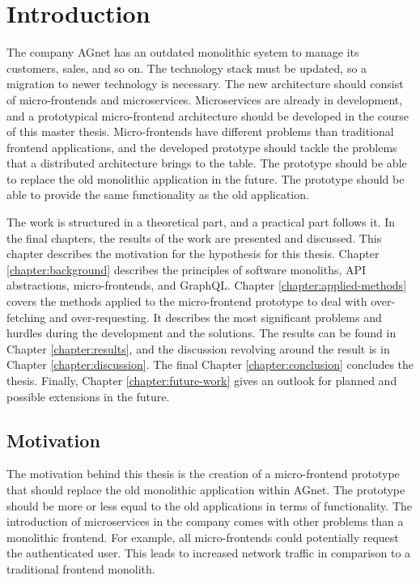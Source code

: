 \chapter{Introduction}\label{chapter:introduction}

The company AGnet has an outdated monolithic system to manage its customers, sales, and so on. The technology stack must be updated, so a migration to newer technology is necessary. The new architecture should consist of micro-frontends and microservices. Microservices are already in development, and a prototypical micro-frontend architecture should be developed in the course of this master thesis. Micro-frontends have different problems than traditional frontend applications, and the developed prototype should tackle the problems that a distributed architecture brings to the table. The prototype should be able to replace the old monolithic application in the future. The prototype should be able to provide the same functionality as the old application.

\bigskip

\noindent The work is structured in a theoretical part, and a practical part follows it. In the final chapters, the results of the work are presented and discussed. This chapter describes the motivation for the hypothesis for this thesis. Chapter \ref{chapter:background} describes the principles of software monoliths, \ac{API} abstractions, micro-frontends, and GraphQL. Chapter \ref{chapter:applied-methods} covers the methods applied to the micro-frontend prototype to deal with over-fetching and over-requesting. It describes the most significant problems and hurdles during the development and the solutions. The results can be found in Chapter \ref{chapter:results}, and the discussion revolving around the result is in Chapter \ref{chapter:discussion}. The final Chapter \ref{chapter:conclusion} concludes the thesis. Finally, Chapter \ref{chapter:future-work} gives an outlook for planned and possible extensions in the future.

\section{Motivation}\label{section:introduction:motivation}

The motivation behind this thesis is the creation of a micro-frontend prototype that should replace the old monolithic application within AGnet. The prototype should be more or less equal to the old applications in terms of functionality. The introduction of microservices in the company comes with other problems than a monolithic frontend. For example, all micro-frontends could potentially request the authenticated user. This leads to increased network traffic in comparison to a traditional frontend monolith.

